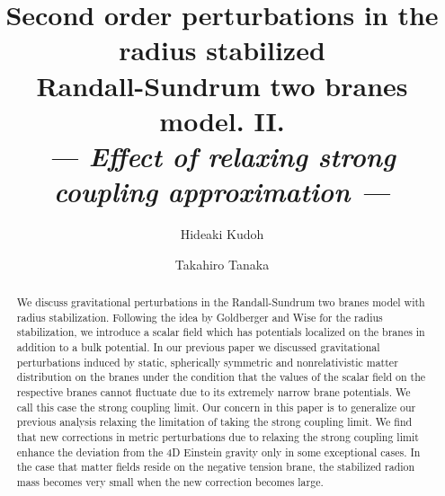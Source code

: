 \documentclass[a4paper,showpacs,preprintnumbers,amsmath,amssymb]{revtex4}
\begin{document}
\title{Second order perturbations in the radius stabilized\\
Randall-Sundrum two branes model. II. \\
\it --- Effect of relaxing strong coupling approximation ---}


\author{Hideaki Kudoh\coordHE{} }
\author{Takahiro Tanaka\coordHE{}} 



\begin{abstract}
We discuss  gravitational perturbations in the Randall-Sundrum two 
branes model with radius stabilization. 
Following the idea by Goldberger and Wise for the radius stabilization, 
we introduce a scalar field which has potentials localized on 
the branes in addition to a bulk potential. 
In our previous paper we discussed gravitational perturbations 
induced by static, spherically symmetric and nonrelativistic matter 
distribution on the branes under the condition 
that the values of the scalar field 
on the respective branes cannot fluctuate due to 
its extremely narrow brane potentials.  
We call this case the strong coupling limit.   
Our concern in this paper is to generalize our previous analysis 
relaxing the limitation of taking the strong coupling limit.  
We find that new corrections in metric perturbations 
due to relaxing the strong coupling limit enhance the deviation from the 
4D Einstein gravity only in some exceptional cases.  
In the case that matter fields reside on the negative 
tension brane, the stabilized radion mass becomes very small when 
the new correction becomes large. 
\end{abstract}

 

\maketitle

\providecommand{\stac}[2]{ \stackrel{\scriptscriptstyle {#1}}{#2}   }

  
\end{document}
